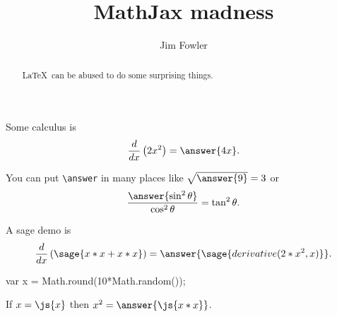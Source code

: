 \documentclass{ximera}
\title{MathJax madness}
\author{Jim Fowler}
\begin{document}
\begin{abstract}
  \LaTeX\ can be abused to do some surprising things.
\end{abstract}

\maketitle

\begin{problem}
  Some calculus is
  \[
    \frac{d}{dx} \left( 2x^2 \right) = \answer{4x}.
  \]

  You can put \verb|\answer| in many places
    like \(\sqrt{\answer{9}} = 3\)
    or \[
      \frac{\answer{\sin^2 \theta}}{\cos^2 \theta} = \tan^2 \theta.
    \]
\end{problem}

\begin{problem}
  A sage demo is
  \[
    \frac{d}{dx} \left( \sage{x*x + x*x} \right) =
      \answer{\sage{derivative(2*x^2,x)}}.
  \]
\end{problem}

\begin{javascript}
  var x = Math.round(10*Math.random());
\end{javascript}

\begin{problem}
  If $x = \js{x}$ then $x^2 = \answer{\js{x*x}}$.
\end{problem}
\end{document}
